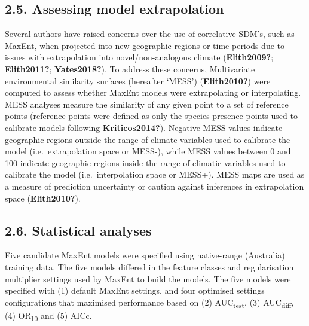 \documentclass[12pt,]{article}
\begin{document}
\hypertarget{assessing-model-extrapolation}{%
\subsection{2.5. Assessing model
extrapolation}\label{assessing-model-extrapolation}}

Several authors have raised concerns over the use of correlative SDM's,
such as MaxEnt, when projected into new geographic regions or time
periods due to issues with extrapolation into novel/non-analogous
climate (\textbf{Elith2009?}; \textbf{Elith2011?}; \textbf{Yates2018?}).
To address these concerns, Multivariate environmental similarity
surfaces (hereafter `MESS') (\textbf{Elith2010?}) were computed to
assess whether MaxEnt models were extrapolating or interpolating. MESS
analyses measure the similarity of any given point to a set of reference
points (reference points were defined as only the species presence
points used to calibrate models following \textbf{Kriticos2014?}).
Negative MESS values indicate geographic regions outside the range of
climate variables used to calibrate the model (i.e.~extrapolation space
or MESS-), while MESS values between 0 and 100 indicate geographic
regions inside the range of climatic variables used to calibrate the
model (i.e.~interpolation space or MESS+). MESS maps are used as a
measure of prediction uncertainty or caution against inferences in
extrapolation space (\textbf{Elith2010?}).

\hypertarget{statistical-analyses}{%
\subsection{2.6. Statistical analyses}\label{statistical-analyses}}

Five candidate MaxEnt models were specified using native-range
(Australia) training data. The five models differed in the feature
classes and regularisation multiplier settings used by MaxEnt to build
the models. The five models were specified with (1) default MaxEnt
settings, and four optimised settings configurations that maximised
performance based on (2) AUC\textsubscript{test}, (3)
AUC\textsubscript{diff}, (4) OR\textsubscript{10} and (5) AICc.
\end{document}
